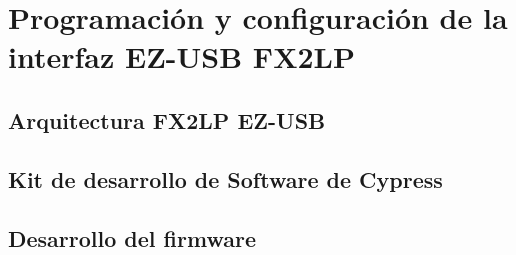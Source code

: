 \chapter{Programación y configuración de la interfaz EZ-USB FX2LP}
	
	\label{cap:cy}
	\section{Arquitectura FX2LP EZ-USB}
		
	\section{Kit de desarrollo de Software de Cypress}
		
	\section{Desarrollo del firmware}
		